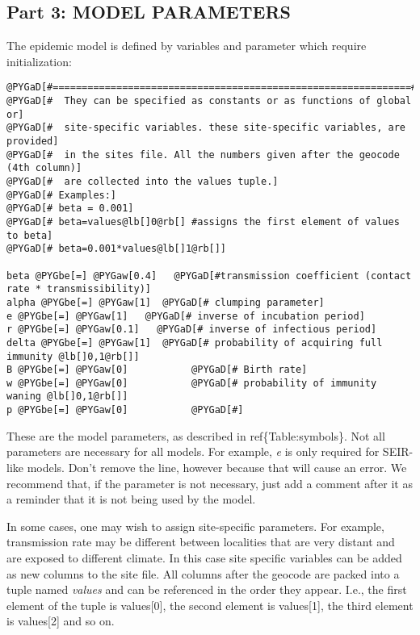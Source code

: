 \documentclass[a4paper,10pt]{manual}
\begin{document}
\subsection{Part 3: MODEL PARAMETERS}

The epidemic model is defined by variables and parameter which require initialization:

\begin{Verbatim}[commandchars=@\[\]]
@PYGaD[#==============================================================#]
@PYGaD[#  They can be specified as constants or as functions of global or]
@PYGaD[#  site-specific variables. these site-specific variables, are provided]
@PYGaD[#  in the sites file. All the numbers given after the geocode (4th column)]
@PYGaD[#  are collected into the values tuple.]
@PYGaD[# Examples:]
@PYGaD[# beta = 0.001]
@PYGaD[# beta=values@lb[]0@rb[] #assigns the first element of values to beta]
@PYGaD[# beta=0.001*values@lb[]1@rb[]]

beta @PYGbe[=] @PYGaw[0.4]   @PYGaD[#transmission coefficient (contact rate * transmissibility)]
alpha @PYGbe[=] @PYGaw[1]  @PYGaD[# clumping parameter]
e @PYGbe[=] @PYGaw[1]   @PYGaD[# inverse of incubation period]
r @PYGbe[=] @PYGaw[0.1]   @PYGaD[# inverse of infectious period]
delta @PYGbe[=] @PYGaw[1]  @PYGaD[# probability of acquiring full immunity @lb[]0,1@rb[]]
B @PYGbe[=] @PYGaw[0]           @PYGaD[# Birth rate]
w @PYGbe[=] @PYGaw[0]           @PYGaD[# probability of immunity waning @lb[]0,1@rb[]]
p @PYGbe[=] @PYGaw[0]           @PYGaD[#]
\end{Verbatim}

These are the model parameters, as described in ref\{Table:symbols\}. Not all parameters are necessary for all models. For example, \emph{e} is only required for SEIR-like models. Don't
remove the line, however because that will cause an error. We recommend that, if the parameter is not necessary, just add a comment after it as a reminder that it is not being used by the model.

In some cases, one may wish to assign site-specific parameters. For example, transmission rate may be different between localities that are very distant and are exposed to different climate. In this case site specific variables can be added as new columns to the site file. All columns after the geocode are packed into a tuple named \emph{values} and can be referenced in the order they appear. I.e., the first element of the tuple is values{[}0{]}, the second element is values{[}1{]}, the third element is values{[}2{]} and so on.
\end{document}
